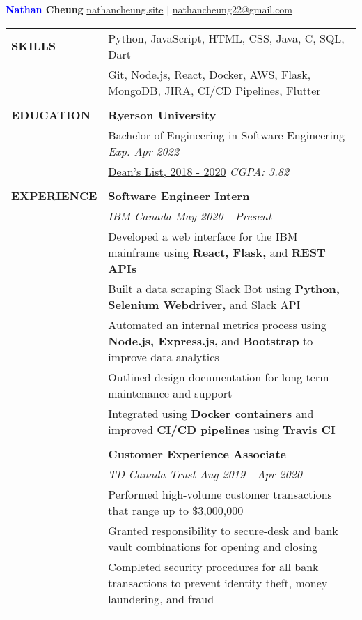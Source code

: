 \documentclass[letterpaper,11pt,oneside]{article}
\makeatletter
\newcommand\tabitem{\makebox[1em][r]{-~~}} %
\newcommand\tabspace{\makebox[1em][r]{~~~}} %
\newcommand{\header}{\noindent \huge{\textbf{\textcolor{blue}{Nathan} Cheung}} \hfill \normalsize{\href{https://nathancheung.site}{nathancheung.site} | \href{mailto:nathancheung22@gmail.com}{nathancheung22@gmail.com}} \\
\vspace{-2ex}
\hline 
\normalsize
\vspace{1.25em}}
\makeatother
\begin{document}
\header %


\noindent \begin{tabular}{@{}p{1.15in} p{6.08in}@{}}
 \textbf{SKILLS} 
     & Python, JavaScript, HTML, CSS, Java, C, SQL, Dart \\
     & Git, Node.js, React, Docker, AWS, Flask, MongoDB, JIRA, CI/CD Pipelines, Flutter \\
     & \\

 \textbf{EDUCATION}
     & \textbf{Ryerson University} \\
     & Bachelor of Engineering in Software Engineering \hfill \textit{Exp. Apr 2022} \\
     & \href{https://www.ryerson.ca/content/dam/engineering-architectural-science/students/current-undergraduate/honours-recognition/pdfs/DeansList20182019September30.pdf}{Dean's List, 2018 - 2020} \hfill \textit{CGPA: 3.82} \\
     & \\

 \textbf{EXPERIENCE} 
     & \textbf{Software Engineer Intern} \\
     & \textit{IBM Canada \hfill May 2020 - Present} \\
     & \tabitem Developed a web interface for the IBM mainframe using \textbf{React, Flask,} and \textbf{REST APIs} \\
     & \tabitem Built a data scraping Slack Bot using \textbf{Python, Selenium Webdriver,} and Slack API \\
     & \tabitem Automated an internal metrics process using \textbf{Node.js, Express.js,} and \textbf{Bootstrap} to \tabspace improve data analytics \\
     & \tabitem Outlined design documentation for long term maintenance and support \\
     & \tabitem Integrated using \textbf{Docker containers} and improved \textbf{CI/CD pipelines} using \textbf{Travis CI} \\
     & \\
 
     & \textbf{Customer Experience Associate} \\
     & \textit{TD Canada Trust \hfill Aug 2019 - Apr 2020} \\
     & \tabitem Performed high-volume customer transactions that range up to \$3,000,000 \\ 
     & \tabitem Granted responsibility to secure-desk and bank vault combinations for opening and closing \\
     & \tabitem Completed security procedures for all bank transactions to prevent identity theft, money \tabspace laundering, and fraud \\
     & \\
     

\end{tabular}
\end{document}
